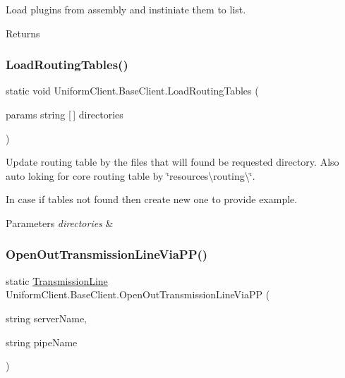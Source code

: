 Load plugins from assembly and instiniate them to list. 

\begin{DoxyReturn}{Returns}

\end{DoxyReturn}
\mbox{\label{class_uniform_client_1_1_base_client_a5f8f22aa4ab8219fb5f1b6a358f68daf}} 
\subsubsection{\texorpdfstring{Load\+Routing\+Tables()}{LoadRoutingTables()}}
{\footnotesize\ttfamily static void Uniform\+Client.\+Base\+Client.\+Load\+Routing\+Tables (\begin{DoxyParamCaption}\item[{params string \mbox{[}$\,$\mbox{]}}]{directories }\end{DoxyParamCaption})\hspace{0.3cm}{\ttfamily [static]}}



Update routing table by the files that will found be requested directory. Also auto loking for core routing table by \char`\"{}resources\textbackslash{}routing\textbackslash{}\char`\"{}. 

In case if tables not found then create new one to provide example. 


\begin{DoxyParams}{Parameters}
{\em directories} & \\
\hline
\end{DoxyParams}
\mbox{\label{class_uniform_client_1_1_base_client_a56ba8d0360e3c65a69d2d69db878ec23}} 
\subsubsection{\texorpdfstring{Open\+Out\+Transmission\+Line\+Via\+P\+P()}{OpenOutTransmissionLineViaPP()}}
{\footnotesize\ttfamily static \mbox{\hyperlink{class_pipes_provider_1_1_client_1_1_transmission_line}{Transmission\+Line}} Uniform\+Client.\+Base\+Client.\+Open\+Out\+Transmission\+Line\+Via\+PP (\begin{DoxyParamCaption}\item[{string}]{server\+Name,  }\item[{string}]{pipe\+Name }\end{DoxyParamCaption})\hspace{0.3cm}{\ttfamily [static]}}



